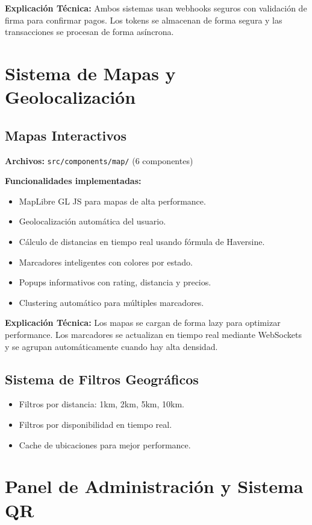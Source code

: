 \documentclass[a4paper,12pt]{article}
\begin{document}
\textbf{Explicación Técnica:}  
Ambos sistemas usan webhooks seguros con validación de firma para confirmar pagos. Los tokens se almacenan de forma segura y las transacciones se procesan de forma asíncrona.

\section{Sistema de Mapas y Geolocalización}

\subsection{Mapas Interactivos}
\textbf{Archivos:} \texttt{src/components/map/} (6 componentes)

\textbf{Funcionalidades implementadas:}
\begin{itemize}
  \item MapLibre GL JS para mapas de alta performance.
  \item Geolocalización automática del usuario.
  \item Cálculo de distancias en tiempo real usando fórmula de Haversine.
  \item Marcadores inteligentes con colores por estado.
  \item Popups informativos con rating, distancia y precios.
  \item Clustering automático para múltiples marcadores.
\end{itemize}

\textbf{Explicación Técnica:}  
Los mapas se cargan de forma lazy para optimizar performance. Los marcadores se actualizan en tiempo real mediante WebSockets y se agrupan automáticamente cuando hay alta densidad.

\subsection{Sistema de Filtros Geográficos}
\begin{itemize}
  \item Filtros por distancia: 1km, 2km, 5km, 10km.
  \item Filtros por disponibilidad en tiempo real.
  \item Cache de ubicaciones para mejor performance.
\end{itemize}

\section{Panel de Administración y Sistema QR}
\end{document}
